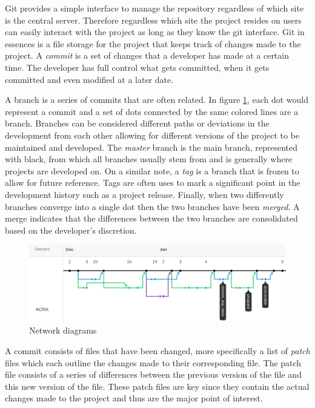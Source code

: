 
Git provides a simple interface to manage the repository regardless of which site is the central server. Therefore regardless which site the project resides on users can easily interact with the project as long as they know the git interface. Git in essences is a file storage for the project that keeps track of changes made to the project. A \textit{commit} is a set of changes that a developer has made at a certain time. The developer has full control what gets committed, when it gets committed and even modified at a later date.

A branch is a series of commits that are often related. In figure \ref{fig:network_diagram}, each dot would represent a commit and a set of dots connected by the same colored lines are a branch. Branches can be considered different paths or deviations in the development from each other allowing for different versions of the project to be maintained and developed. The \textit{master} branch is the main branch, represented with black, from which all branches usually stem from and is generally where projects are developed on. On a similar note, a \textit{tag} is a branch that is frozen to allow for future reference. Tags are often uses to mark a significant point in the development history such as a project release. Finally, when two differently branches converge into a single dot then the two branches have been \textit{merged}. A merge indicates that the differences between the two branches are consolidated based on the developer's discretion.

\begin{figure}[!ht]
    \centering
        \includegraphics[width=1.0\textwidth]{images/network}
    \caption{Network diagrams}
    \label{fig:network_diagram}
\end{figure}

A commit consists of files that have been changed, more specifically a list of \textit{patch} files which each outline the changes made to their corresponding file. The patch file consists of a series of differences between the previous version of the file and this new version of the file. These patch files are key since they contain the actual changes made to the project and thus are the major point of interest.

